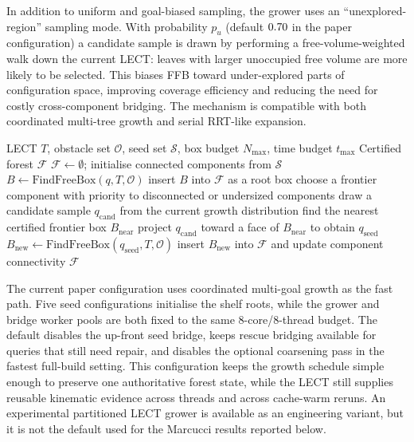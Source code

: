 \documentclass[journal]{IEEEtran}
\newcommand{\calO}{\ensuremath{\mathcal{O}}}
\begin{document}
In addition to uniform and goal-biased sampling, the grower uses an
``unexplored-region'' sampling mode. With probability $p_u$ (default
$0.70$ in the paper configuration) a candidate sample is drawn by
performing a free-volume-weighted walk down the current LECT: leaves with
larger unoccupied free volume are more likely to be selected. This biases FFB
toward under-explored parts of configuration space, improving coverage
efficiency and reducing the need for costly cross-component bridging. The
mechanism is compatible with both coordinated multi-tree growth and serial
RRT-like expansion.

\begin{algorithm}[t]
\caption{Certified Forest Growth}
\label{alg:forest_growth}
\footnotesize
\begin{algorithmic}[1]
\REQUIRE LECT $T$, obstacle set $\calO$, seed set $\mathcal{S}$, box budget $N_{\max}$, time budget $t_{\max}$
\ENSURE Certified forest $\mathcal{F}$
\STATE $\mathcal{F} \gets \emptyset$; initialise connected components from $\mathcal{S}$
  \STATE $B \gets \text{FindFreeBox}(q, T, \calO)$
    \STATE insert $B$ into $\mathcal{F}$ as a root box
  \ENDIF
\ENDFOR
{}
  \STATE choose a frontier component with priority to disconnected or undersized components
  \STATE draw a candidate sample $q_{\mathrm{cand}}$ from the current growth distribution
  \STATE find the nearest certified frontier box $B_{\mathrm{near}}$
  \STATE project $q_{\mathrm{cand}}$ toward a face of $B_{\mathrm{near}}$ to obtain $q_{\mathrm{seed}}$
  \STATE $B_{\mathrm{new}} \gets \text{FindFreeBox}(q_{\mathrm{seed}}, T, \calO)$
    \STATE insert $B_{\mathrm{new}}$ into $\mathcal{F}$ and update component connectivity
  \ENDIF
\ENDWHILE
\STATE \RETURN $\mathcal{F}$
\end{algorithmic}
\end{algorithm}

The current paper configuration uses coordinated multi-goal growth as the fast
path. Five seed configurations initialise the shelf roots, while the grower and
bridge worker pools are both fixed to the same 8-core/8-thread budget. The
default disables the up-front seed bridge, keeps rescue bridging available for
queries that still need repair, and disables the optional coarsening pass in the
fastest full-build setting. This configuration keeps the growth schedule simple
enough to preserve one authoritative forest state, while the LECT still supplies
reusable kinematic evidence across threads and across cache-warm reruns. An
experimental partitioned LECT grower is available as an engineering variant, but
it is not the default used for the Marcucci results reported below.
\end{document}
